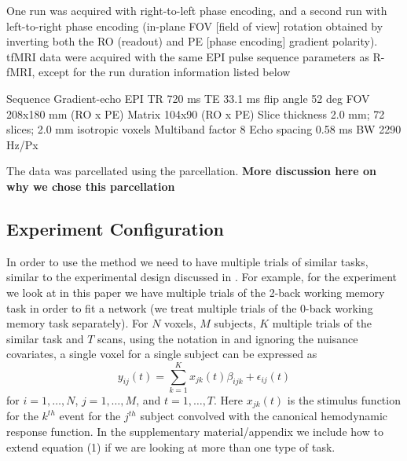 \documentclass[12pt]{article}
\begin{document}
One run was acquired with right-to-left phase
encoding, and a second run with left-to-right phase encoding (in-plane FOV [field of view]
rotation obtained by inverting both the RO (readout) and PE [phase encoding] gradient polarity).
tfMRI data were acquired with the same EPI pulse sequence parameters as R-fMRI, except for
the run duration information listed below

Sequence Gradient-echo EPI
TR 720 ms
TE 33.1 ms
flip angle 52 deg
FOV 208x180 mm (RO x PE)
Matrix 104x90 (RO x PE)
Slice thickness 2.0 mm; 72 slices; 2.0 mm isotropic voxels
Multiband factor 8
Echo spacing 0.58 ms
BW 2290 Hz/Px

The data was parcellated using the \cite{gordon2016generation} parcellation.  {\bf More discussion here on why we chose this parcellation}

\subsection{Experiment Configuration}
In order to use the method we need to have multiple trials of similar tasks, similar to the experimental design discussed in \cite{rissman2004measuring}.  For example, for the experiment we look at in this paper we have multiple trials of the 2-back working memory task in order to fit a network (we treat multiple trials of the 0-back working memory task separately).  For $N$ voxels, $M$ subjects, $K$ multiple trials of the similar task and $T$ scans, using the notation in \cite{lindquist2008statistical} and ignoring the 
nuisance covariates, a single voxel for a single subject can be expressed as 
\begin{equation}y_{ij}(t) = \sum_{k=1}^Kx_{jk}(t)\beta_{ijk} + \epsilon_{ij}(t)\end{equation}
for $i = 1, \dots, N$, $j = 1, \dots, M$, and $t = 1, \dots, T$.  Here $x_{jk}(t)$ is the stimulus function for the $k^{th}$ event for the $j^{th}$ subject convolved with the canonical hemodynamic response function.  In the supplementary material/appendix we include how to extend equation (1) if we are looking at more than one type of task.  

\end{document}
